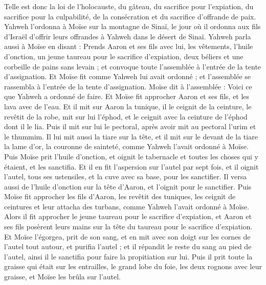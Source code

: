 \begin{multicols}{2}
Telle est donc la loi de l'holocauste, du gâteau, du sacrifice pour l'expiation, du sacrifice pour la culpabilité, de la consécration et du sacrifice d'offrande de paix.
Yahweh l'ordonna à Moïse sur la montagne de Sinaï, le jour où il ordonna aux fils d'Israël d'offrir leurs offrandes à Yahweh dans le désert de Sinaï.
\VerseOne{}Yahweh parla aussi à Moïse en disant :
Prends Aaron et ses fils avec lui, les vêtements, l'huile d'onction, un jeune taureau pour le sacrifice d'expiation, deux béliers et une corbeille de pains sans levain ;
et convoque toute l'assemblée à l'entrée de la tente d'assignation.
Et Moïse fit comme Yahweh lui avait ordonné ; et l'assemblée se rassembla à l'entrée de la tente d'assignation.
Moïse dit à l'assemblée : Voici ce que Yahweh a ordonné de faire.
Et Moïse fit approcher Aaron et ses fils, et les lava avec de l'eau.
Et il mit sur Aaron la tunique, il le ceignit de la ceinture, le revêtit de la robe, mit sur lui l'éphod, et le ceignit avec la ceinture de l'éphod dont il le lia.
Puis il mit sur lui le pectoral, après avoir mit au pectoral l'urim et le thummim.
Il lui mit aussi la tiare sur la tête, et il mit sur le devant de la tiare la lame d'or, la couronne de sainteté, comme Yahweh l'avait ordonné à Moïse.
Puis Moïse prit l'huile d'onction, et oignit le tabernacle et toutes les choses qui y étaient, et les sanctifia.
Et il en fit l'aspersion sur l'autel par sept fois, et il oignit l'autel, tous ses ustensiles, et la cuve avec sa base, pour les sanctifier.
Il versa aussi de l'huile d'onction sur la tête d'Aaron, et l'oignit pour le sanctifier.
Puis Moïse fit approcher les fils d'Aaron, les revêtit des tuniques, les ceignit de ceintures et leur attacha des turbans, comme Yahweh l'avait ordonné à Moïse.
Alors il fit approcher le jeune taureau pour le sacrifice d'expiation, et Aaron et ses fils posèrent leurs mains sur la tête du taureau pour le sacrifice d'expiation.
Et Moïse l'égorgea, prit de son sang, et en mit avec son doigt sur les cornes de l'autel tout autour, et purifia l'autel ; et il répandit le reste du sang au pied de l'autel, ainsi il le sanctifia pour faire la propitiation sur lui.
Puis il prit toute la graisse qui était sur les entrailles, le grand lobe du foie, les deux rognons avec leur graisse, et Moïse les brûla sur l'autel.

\end{multicols}

